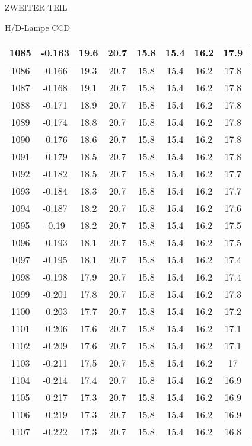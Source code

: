 \begin{appendix}
\begin{chapter}{ZWEITER TEIL}
\begin{section}{H/D-Lampe CCD}
\begin{scriptsize}
\begin{longtable}[htbp]{|c|c|c|c|c|c|c|c|}
            1085 & -0.163 & 19.6 & 20.7 & 15.8 & 15.4 & 16.2 & 17.9 \\ \hline
            1086 & -0.166 & 19.3 & 20.7 & 15.8 & 15.4 & 16.2 & 17.8 \\ \hline
            1087 & -0.168 & 19.1 & 20.7 & 15.8 & 15.4 & 16.2 & 17.8 \\ \hline
            1088 & -0.171 & 18.9 & 20.7 & 15.8 & 15.4 & 16.2 & 17.8 \\ \hline
            1089 & -0.174 & 18.8 & 20.7 & 15.8 & 15.4 & 16.2 & 17.8 \\ \hline
            1090 & -0.176 & 18.6 & 20.7 & 15.8 & 15.4 & 16.2 & 17.8 \\ \hline
            1091 & -0.179 & 18.5 & 20.7 & 15.8 & 15.4 & 16.2 & 17.8 \\ \hline
            1092 & -0.182 & 18.5 & 20.7 & 15.8 & 15.4 & 16.2 & 17.7 \\ \hline
            1093 & -0.184 & 18.3 & 20.7 & 15.8 & 15.4 & 16.2 & 17.7 \\ \hline
            1094 & -0.187 & 18.2 & 20.7 & 15.8 & 15.4 & 16.2 & 17.6 \\ \hline
            1095 & -0.19 & 18.2 & 20.7 & 15.8 & 15.4 & 16.2 & 17.5 \\ \hline
            1096 & -0.193 & 18.1 & 20.7 & 15.8 & 15.4 & 16.2 & 17.5 \\ \hline
            1097 & -0.195 & 18.1 & 20.7 & 15.8 & 15.4 & 16.2 & 17.4 \\ \hline
            1098 & -0.198 & 17.9 & 20.7 & 15.8 & 15.4 & 16.2 & 17.4 \\ \hline
            1099 & -0.201 & 17.8 & 20.7 & 15.8 & 15.4 & 16.2 & 17.3 \\ \hline
            1100 & -0.203 & 17.7 & 20.7 & 15.8 & 15.4 & 16.2 & 17.2 \\ \hline
            1101 & -0.206 & 17.6 & 20.7 & 15.8 & 15.4 & 16.2 & 17.1 \\ \hline
            1102 & -0.209 & 17.6 & 20.7 & 15.8 & 15.4 & 16.2 & 17.1 \\ \hline
            1103 & -0.211 & 17.5 & 20.7 & 15.8 & 15.4 & 16.2 & 17 \\ \hline
            1104 & -0.214 & 17.4 & 20.7 & 15.8 & 15.4 & 16.2 & 16.9 \\ \hline
            1105 & -0.217 & 17.3 & 20.7 & 15.8 & 15.4 & 16.2 & 16.9 \\ \hline
            1106 & -0.219 & 17.3 & 20.7 & 15.8 & 15.4 & 16.2 & 16.9 \\ \hline
            1107 & -0.222 & 17.3 & 20.7 & 15.8 & 15.4 & 16.2 & 16.8 \\ \hline

\end{longtable}
\end{scriptsize}
\end{section}
\end{chapter}
\end{appendix}
